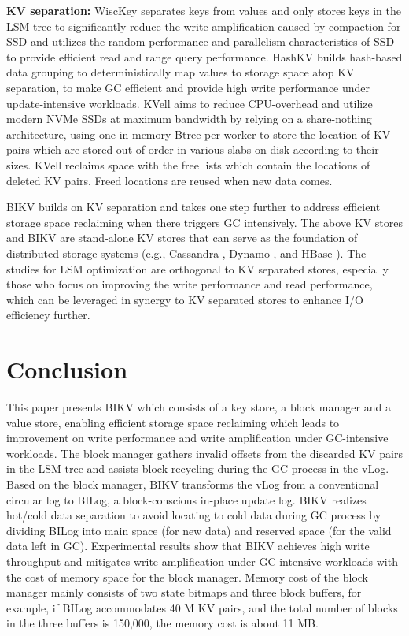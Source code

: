 \documentclass[sigconf]{acmart}
\begin{document}
\textbf{KV separation:} WiscKey \cite{Wisckey} separates keys from values and only stores keys in the LSM-tree to significantly reduce the write amplification caused by compaction for SSD and utilizes the random performance and parallelism characteristics of SSD to provide efficient read and range query performance. HashKV \cite{HashKV} builds hash-based data grouping to deterministically map values to storage space atop KV separation, to make GC efficient and provide high write performance under update-intensive workloads. KVell \cite{KVell} aims to reduce CPU-overhead and utilize modern NVMe SSDs at maximum bandwidth by relying on a share-nothing architecture, using one in-memory Btree per worker to store the location of KV pairs which are stored out of order in various slabs on disk according to their sizes. KVell reclaims space with the free lists which contain the locations of deleted KV pairs. Freed locations are reused when new data comes.

BIKV builds on KV separation and takes one step further to address efficient storage space reclaiming when there triggers GC intensively. The above KV stores and BIKV are stand-alone KV stores that can serve as the foundation of distributed storage systems (e.g., Cassandra \cite{ Cassandra}, Dynamo \cite{ Dynamo}, and HBase \cite{HBase}). The studies for LSM optimization are orthogonal to KV separated stores, especially those who focus on improving the write performance and read performance, which can be leveraged in synergy to KV separated stores to enhance I/O efficiency further.

\section{Conclusion}
This paper presents BIKV which consists of a key store, a block manager and a value store, enabling efficient storage space reclaiming which leads to improvement on write performance and write amplification under GC-intensive workloads. The block manager gathers invalid offsets from the discarded KV pairs in the LSM-tree and assists block recycling during the GC process in the vLog. Based on the block manager, BIKV transforms the vLog from a conventional circular log to BILog, a block-conscious in-place update log. BIKV realizes hot/cold data separation to avoid locating to cold data during GC process by dividing BILog into main space (for new data) and reserved space (for the valid data left in GC). Experimental results show that BIKV achieves high write throughput and mitigates write amplification under GC-intensive workloads with the cost of memory space for the block manager. Memory cost of the block manager mainly consists of two state bitmaps and three block buffers, for example, if BILog accommodates 40 M KV pairs, and the total number of blocks in the three buffers is 150,000, the memory cost is about 11 MB.

\end{document}
